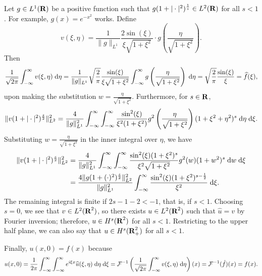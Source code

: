 \documentclass{homework}
\begin{document}
	Let $g \in L^1(\textnormal{\bf R})$ be a positive function such that $g(1+|\cdot|^2)^\frac{1}{s} \in L^2(\textnormal{\bf R})$ for all $s < 1$. For example, $g(x) = e^{-x^2}$ works. Define 
	\begin{equation*}
		v(\xi, \eta) = \frac{1}{\lVert g\rVert_{L^1}}\frac{2\sin(\xi)}{\xi\sqrt{1+\xi^2}}\cdot g\left(\frac{\eta}{\sqrt{1+\xi^2}}\right).
	\end{equation*}
	Then
	\begin{equation*}
		\frac{1}{\sqrt{2\pi}}\int_{-\infty}^\infty v(\xi, \eta)\;\text{d}\eta = \frac{1}{\lVert g\rVert_{L^1}}\sqrt{\frac{2}{\pi}}\frac{\sin(\xi)}{\xi\sqrt{1+\xi^2}}\int_{-\infty}^\infty
		 g\left(\frac{\eta}{\sqrt{1+\xi^2}}\right)\;\text{d} \eta = \sqrt{\frac{2}{\pi}}\frac{\sin(\xi)}{\xi} = \widehat{f}(\xi),
	\end{equation*}
	upon making the substitution $w = \frac{\eta}{\sqrt{1+\xi^2}}$. Furthermore, for $s \in \textnormal{\bf R}$,
	\begin{equation*}
		\lVert v (1 + |\cdot|^2)^\frac{s}{2}\rVert_{L^2}^2 = \frac{4}{\lVert g\rVert_{L^1}^2}\int_{-\infty}^\infty\int_{-\infty}^\infty\frac{\sin^2(\xi)}{\xi^2(1+\xi^2)}g^2\left(\frac{\eta}{\sqrt{1+\xi^2}}\right)(1+\xi^2+\eta^2)^s\;\text{d}\eta\;\text{d}\xi.
	\end{equation*}
	Substituting $w = \frac{\eta}{\sqrt{1+\xi^2}}$ in the inner integral over $\eta$, we have
	\begin{align*}
		\lVert v (1 + |\cdot|^2)^\frac{s}{2}\rVert_{L^2}^2 &= \frac{4}{\lVert g\rVert_{L^1}^2}\int_{-\infty}^\infty\int_{-\infty}^\infty\frac{\sin^2(\xi)(1+\xi^2)^s}{\xi^2\sqrt{1+\xi^2}}g^2(w)(1+w^2)^s\;\text{d} w\;\text{d}\xi \\
		&= \frac{4\lVert g(1 + (\cdot)^2)^\frac{s}{2}\rVert_{L^2}^2}{\lVert g\rVert_{L^1}^2}\int_{-\infty}^\infty \frac{\sin^2(\xi)(1+\xi^2)^{s-\frac{1}{2}}}{\xi^2}\;\text{d} \xi.
	\end{align*}
	The remaining integral is finite if $2s-1-2 < -1$, that is, if $s < 1$. Choosing $s = 0$, we see that $v \in L^2(\textnormal{\bf R}^2)$, so there exists $u \in L^2(\textnormal{\bf R}^2)$ such that $\widehat{u} = v$ by Fourier inversion; therefore, $u \in H^s(\textnormal{\bf R}^2)$ for all $s < 1$. Restricting to the upper half plane, we can also say that $u \in H^s(\textnormal{\bf R}_+^2)$ for all $s < 1$.
	
	Finally, $u(x,0) = f(x)$ because
	\begin{equation*}
		u(x,0) = \frac{1}{2\pi}\int_{-\infty}^\infty\int_{-\infty}^\infty e^{i\xi x} \widehat{u}(\xi,\eta)\;\text{d}\eta\;\text{d}\xi = \mathcal{F}^{-1}\left(\frac{1}{\sqrt{2\pi}}\int_{-\infty}^\infty v(\xi,\eta)\;\text{d}\eta\right)(x) = \mathcal{F}^{-1}(\hat{f})(x) = f(x).
	\end{equation*}
	
\end{document}
